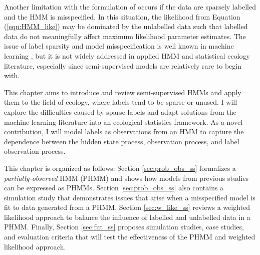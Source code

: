 Another limitation with the formulation of \citet{McClintock:2018} occurs if the data are sparsely labelled and the HMM is misspecified. In this situation, the likelihood from Equation (\ref{eqn:HMM_like}) may be dominated by the unlabelled data such that labelled data do not meaningfully affect maximum likelihood parameter estimates. The issue of label sparsity and model misspecification is well known in machine learning \citep{Chapelle:2006,Ren:2020}, but it is not widely addressed in applied HMM and statistical ecology literature, especially since semi-supervised models are relatively rare to begin with.
 
This chapter aims to introduce and review semi-supervised HMMs and apply them to the field of ecology, where labels tend to be sparse or unused. I will explore the difficulties caused by sparse labels and adapt solutions from the machine learning literature into an ecological statistics framework. As a novel contribution, I will model labels as observations from an HMM to capture the dependence between the hidden state process, observation process, and label observation process.

This chapter is organized as follows: Section \ref{sec:prob_obs_ss} formalizes a \textit{partially-observed} HMM (PHMM) and shows how models from previous studies can be expressed as PHMMs. Section \ref{sec:prob_obs_ss} also contains a simulation study that demonstrates issues that arise when a misspecified model is fit to data generated from a PHMM. Section \ref{sec:w_like_ss} reviews a weighted likelihood approach to balance the influence of labelled and unlabelled data in a PHMM. Finally, Section \ref{sec:fut_ss} proposes simulation studies, case studies, and evaluation criteria that will test the effectiveness of the PHMM and weighted likelihood approach.